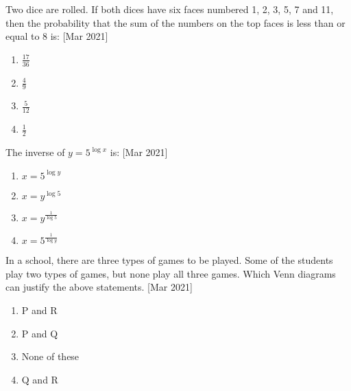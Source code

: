 \iffalse
\title{2021}
\author{AI24BTECH11009}
\section{mcq-single}
\fi
\item Two dice are rolled. If both dices have six faces numbered 1, 2, 3, 5, 7 and 11, then the probability that the sum of the numbers on the top faces is less than or equal to 8 is: \hfill[Mar 2021]
\begin{enumerate}
    \item $\frac{17}{36}$
    \item $\frac{4}{9}$
    \item $\frac{5}{12}$
    \item $\frac{1}{2}$\\
\end{enumerate}
\item The inverse of $y = 5^{\log{x}}$ is: \hfill[Mar 2021]
  \begin{enumerate}
      \item $x = 5^{\log{y}}$
      \item $x = y^{\log{5}}$
      \item $x = y^{\frac{1}{\log{5}}}$
      \item $x = 5^{\frac{1}{\log{y}}}$\\
  \end{enumerate}
\item In a school, there are three types of games to be played. Some of the students play two types of games, but none play all three games. Which Venn diagrams can justify the above statements. \hfill[Mar 2021]
\begin{figure}[!ht]
\centering
{}%
\end{figure}
\begin{enumerate}
         \item P and R
         \item P and Q
         \item None of these
         \item Q and R\\
     \end{enumerate}

